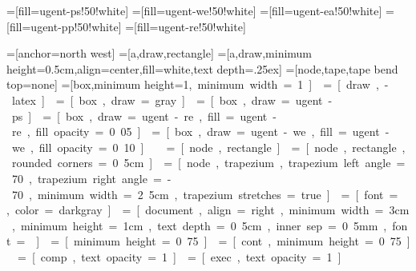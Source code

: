 \usepackage{amsmath}
\usepackage{tikz}
\usepackage{xcolor}

\usetikzlibrary{shapes,arrows,positioning,backgrounds,calc,intersections,calc}


=[fill=ugent-ps!50!white]
=[fill=ugent-we!50!white]
=[fill=ugent-ea!50!white]
=[fill=ugent-pp!50!white]
=[fill=ugent-re!50!white]

\newlength{\unit}
\setlength{\unit}{0.75cm}

=[anchor=north west]
=[a,draw,rectangle]
=[a,draw,minimum height=0.5cm,align=center,fill=white,text depth=.25ex]
=[node,tape,tape bend top=none]
=[box,minimum height=1\unit,minimum width=1\unit]
=[draw, -latex]
=[box,draw=gray]

=[box,draw=ugent-ps]
=[box,draw=ugent-re,fill=ugent-re,fill opacity=0.05]
=[box,draw=ugent-we,fill=ugent-we,fill opacity=0.10]


=[node,rectangle]
=[node,rectangle,rounded corners=0.5cm]
=[node,trapezium,trapezium left angle=70,trapezium right angle=-70,minimum width=2.5cm,trapezium stretches=true]
=[font=\footnotesize,color=darkgray]
=[document,align=right,minimum width=3cm,minimum height=1cm,text depth=0.5cm,inner sep=0.5mm,font=\scriptsize]

=[minimum height=0.75\unit]
=[cont,minimum height=0.75\unit]
=[comp,text opacity=1]
=[exec,text opacity=1]
